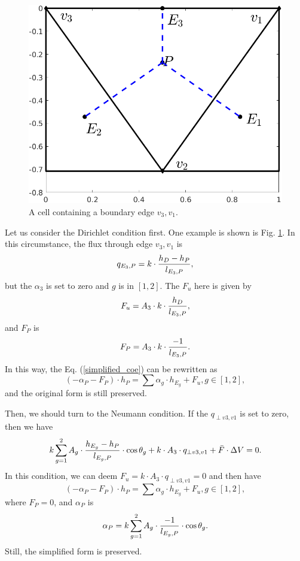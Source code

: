 \documentclass{article}        %
\begin{document}
\begin{figure}[htb]
	\centering
	\includegraphics[scale=0.4]{figures/1st_bc.png}
	\caption{A cell containing a boundary edge $v_3, v_1$.}
	\label{1st_bc}
\end{figure}

Let us consider the Dirichlet condition first. One example is shown is Fig. \ref{1st_bc}. In this circumstance, the flux through edge $v_3,v_1$ is
\begin{equation}
	q_{E_3, P} = k \cdot \frac{h_D - h_P}{l_{E_3, P}}, \notag
\end{equation}
but the $\alpha_3$ is set to zero and $g$ is in $[1,2]$. The $F_u$ here is given by
\begin{equation}
F_u = A_3 \cdot k\cdot \frac{h_D}{l_{E_3, P}}, \notag	
\end{equation}
and $F_P$ is
\begin{equation}
	F_P = A_3\cdot k \cdot\frac{-1}{l_{E_3, P}}. \notag
\end{equation}
In this way, the Eq. (\ref{simplified_coe}) can be rewritten as
\begin{equation}
	(-\alpha_P - F_P)\cdot h_P = \sum \alpha_g \cdot h_{E_g} + F_u, g \in [1,2],
\end{equation}
and the original form is still preserved.

Then, we should turn to the Neumann condition. If the $q_{\perp v3,v1}$ is set to zero, then we have
\begin{equation}
k\sum_{g = 1}^{2}A_g \cdot \frac{h_{E_g}-h_P}{l_{E_g,P}}\cdot \cos{\theta_g} + k \cdot A_3 \cdot q_{\perp v3,v1}  + \bar{F}\cdot \Delta V = 0. \notag
\end{equation}
In this condition, we can deem $F_u = k \cdot A_3 \cdot q_{\perp v3,v1} = 0$ and then have
\begin{equation}
(-\alpha_P - F_P)\cdot h_P = \sum \alpha_g \cdot h_{E_g} + F_u, g \in [1,2],
\end{equation}
where $F_P = 0$, and $\alpha_P$ is
\begin{equation}
	\alpha_P = k\sum_{g = 1}^{2} A_g\cdot \frac{-1}{l_{E_g, P}}\cdot \cos{\theta_g}. \notag	
\end{equation}
Still, the simplified form is preserved.


 
\end{document}

